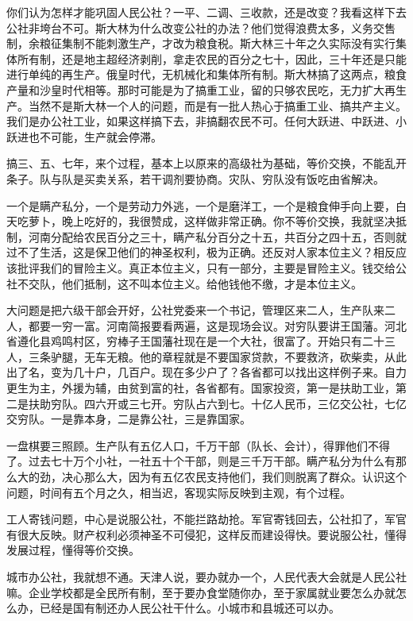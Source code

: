 你们认为怎样才能巩固人民公社？一平、二调、三收款，还是改变？我看这样下去公社非垮台不可。斯大林为什么改变公社的办法？他们觉得浪费太多，义务交售制，余粮征集制不能刺激生产，才改为粮食税。斯大林三十年之久实际没有实行集体所有制，还是地主超经济剥削，拿走农民的百分之七十，因此，三十年还是只能进行单纯的再生产。俄皇时代，无机械化和集体所有制。斯大林搞了这两点，粮食产量和沙皇时代相等。那时可能是为了搞重工业，留的只够农民吃，无力扩大再生产。当然不是斯大林一个人的问题，而是有一批人热心于搞重工业、搞共产主义。我们是办公社工业，如果这样搞下去，非搞翻农民不可。任何大跃进、中跃进、小跃进也不可能，生产就会停滞。

搞三、五、七年，来个过程，基本上以原来的高级社为基础，等价交换，不能乱开条子。队与队是买卖关系，若干调剂要协商。灾队、穷队没有饭吃由省解决。

一个是瞒产私分，一个是劳动力外逃，一个是磨洋工，一个是粮食伸手向上要，白天吃萝卜，晚上吃好的，我很赞成，这样做非常正确。你不等价交换，我就坚决抵制，河南分配给农民百分之三十，瞒产私分百分之十五，共百分之四十五，否则就过不了生活，这是保卫他们的神圣权利，极为正确。还反对人家本位主义？相反应该批评我们的冒险主义。真正本位主义，只有一部分，主要是冒险主义。钱交给公社不交队，他们抵制，这不叫本位主义。给他钱他不缴，才是本位主义。

大问题是把六级干部会开好，公社党委来一个书记，管理区来二人，生产队来二人，都要一穷一富。河南简报要看两遍，这是现场会议。对穷队要讲王国藩。河北省遵化县鸡鸣村区，穷棒子王国藩社现在是一个大社，很富了。开始只有二十三人，三条驴腿，无车无粮。他的章程就是不要国家贷款，不要救济，砍柴卖，从此出了名，变为几十户，几百户。现在多少户了？各省都可以找出这样例子来。自力更生为主，外援为辅，由贫到富的社，各省都有。国家投资，第一是扶助工业，第二是扶助穷队。四六开或三七开。穷队占六到七。十亿人民币，三亿交公社，七亿交穷队。一是靠本身，二是靠公社，三是靠国家。

一盘棋要三照顾。生产队有五亿人口，千万干部（队长、会计），得罪他们不得了。过去七十万个小社，一社五十个干部，则是三千万干部。瞒产私分为什么有那么大的劲，决心那么大，因为有五亿农民支持他们，我们则脱离了群众。认识这个问题，时间有五个月之久，相当迟，客现实际反映到主观，有个过程。

工人寄钱问题，中心是说服公社，不能拦路劫抢。军官寄钱回去，公社扣了，军官有很大反映。财产权利必须神圣不可侵犯，这样反而建设得快。要说服公社，懂得发展过程，懂得等价交换。

城市办公社，我就想不通。天津人说，要办就办一个，人民代表大会就是人民公社嘛。企业学校都是全民所有制，至于要办食堂随你办，至于家属就业要怎么办就怎么办，已经是国有制还办人民公社干什么。小城市和县城还可以办。

